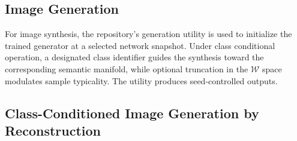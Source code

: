 \subsection{Image Generation}

For image synthesis, the repository’s generation utility is used to initialize the trained generator at a selected network snapshot. Under class conditional operation, a designated class identifier guides the synthesis toward the corresponding semantic manifold, while optional truncation in the \(\mathcal{W}\) space modulates sample typicality. The utility produces seed-controlled outputs.


\subsection{Class-Conditioned Image Generation by Reconstruction}
\label{subsec:generation_reconstruction}

